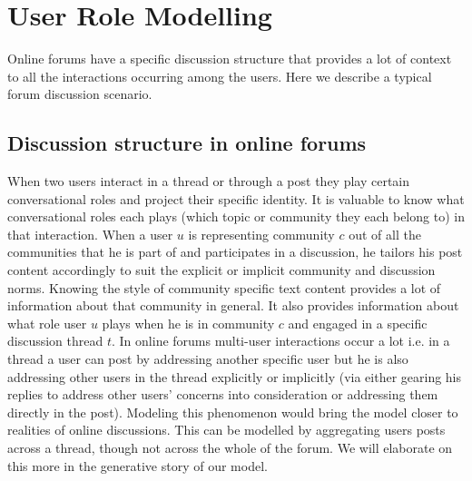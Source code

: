 \documentclass{sig-alternate}
\newcommand{\comment}[1]{\textcolor{red}{[#1]}}
\begin{document}
\section{User Role Modelling}
\label{sec:approach}
Online forums have a specific discussion structure  that
provides a lot of context to all the interactions occurring among the users.
Here we describe a typical forum discussion scenario.

\subsection{Discussion structure in online forums}
When two users interact in a thread or through a post
they play certain conversational roles and project their specific identity.
It is valuable to know what conversational roles each plays (which topic or
community they each belong to) in that interaction. When a user $u$ is
representing community $c$ out of all the communities that he is part of and
participates in a discussion, he tailors his post content accordingly to suit
the explicit or implicit community and discussion norms. Knowing the style of
community specific text content provides a lot of information about that community 
in general. It also provides information about what role user $u$ plays when he
is in community $c$ and engaged in a specific discussion thread $t$. In online
forums multi-user interactions occur a lot i.e.
in a thread a user can post by addressing another specific user but he is
also addressing other users in the thread explicitly or implicitly (via either
gearing his replies to address other users' concerns into consideration or
addressing them directly in the post).
Modeling this phenomenon would bring the model closer to realities of online discussions.
This can be modelled by aggregating users posts across a thread,
though not across the whole of the forum. We will elaborate on this more in the
generative story of our model. 

\end{document}
